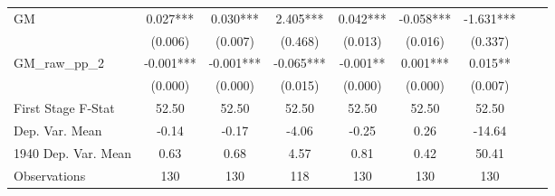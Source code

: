 \begin{tabular}{l*{8}{c}}
GM              &    0.027***&    0.030***&    2.405***&    0.042***&   -0.058***&   -1.631***\\
                &  (0.006)   &  (0.007)   &  (0.468)   &  (0.013)   &  (0.016)   &  (0.337)   \\
\addlinespace
GM\_raw\_pp\_2     &   -0.001***&   -0.001***&   -0.065***&   -0.001** &    0.001***&    0.015** \\
                &  (0.000)   &  (0.000)   &  (0.015)   &  (0.000)   &  (0.000)   &  (0.007)   \\
\midrule
First Stage F-Stat&    52.50   &    52.50   &    52.50   &    52.50   &    52.50   &    52.50   \\
Dep. Var. Mean  &    -0.14   &    -0.17   &    -4.06   &    -0.25   &     0.26   &   -14.64   \\
1940 Dep. Var. Mean&     0.63   &     0.68   &     4.57   &     0.81   &     0.42   &    50.41   \\
Observations    &      130   &      130   &      118   &      130   &      130   &      130   \\
 \bottomrule \end{tabular}
